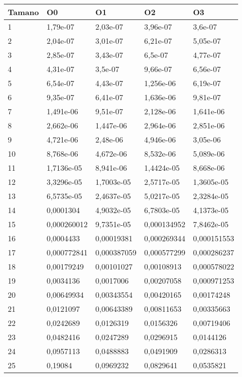 \begin{tabular}{|l|l|l|l|l|}
	\hline
	Tamano & O0 & O1 & O2 & O3 \\
	\hline
	\hline
	1 & 1,79e-07 & 2,03e-07 & 3,96e-07 & 3,6e-07 \\
	\hline
	2 & 2,04e-07 & 3,01e-07 & 6,21e-07 & 5,05e-07 \\
	\hline
	3 & 2,85e-07 & 3,43e-07 & 6,5e-07 & 4,77e-07 \\
	\hline
	4 & 4,31e-07 & 3,5e-07 & 9,66e-07 & 6,56e-07 \\
	\hline
	5 & 6,54e-07 & 4,43e-07 & 1,256e-06 & 6,19e-07 \\
	\hline
	6 & 9,35e-07 & 6,41e-07 & 1,636e-06 & 9,81e-07 \\
	\hline
	7 & 1,491e-06 & 9,51e-07 & 2,128e-06 & 1,641e-06 \\
	\hline
	8 & 2,662e-06 & 1,447e-06 & 2,964e-06 & 2,851e-06 \\
	\hline
	9 & 4,721e-06 & 2,48e-06 & 4,946e-06 & 3,05e-06 \\
	\hline
	10 & 8,768e-06 & 4,672e-06 & 8,532e-06 & 5,089e-06 \\
	\hline
	11 & 1,7136e-05 & 8,941e-06 & 1,4424e-05 & 8,668e-06 \\
	\hline
	12 & 3,3296e-05 & 1,7003e-05 & 2,5717e-05 & 1,3605e-05 \\
	\hline
	13 & 6,5735e-05 & 2,4637e-05 & 5,0217e-05 & 2,3284e-05 \\
	\hline
	14 & 0,0001304 & 4,9032e-05 & 6,7803e-05 & 4,1373e-05 \\
	\hline
	15 & 0,000260012 & 9,7351e-05 & 0,000134952 & 7,8462e-05 \\
	\hline
	16 & 0,0004433 & 0,00019381 & 0,000269344 & 0,000151553 \\
	\hline
	17 & 0,000772841 & 0,000387059 & 0,000577299 & 0,000286237 \\
	\hline
	18 & 0,00179249 & 0,00101027 & 0,00108913 & 0,000578022 \\
	\hline
	19 & 0,0034136 & 0,0017006 & 0,00207058 & 0,000971253 \\
	\hline
	20 & 0,00649934 & 0,00343554 & 0,00420165 & 0,00174248 \\
	\hline
	21 & 0,0121097 & 0,00643389 & 0,00811653 & 0,00335663 \\
	\hline
	22 & 0,0242689 & 0,0126319 & 0,0156326 & 0,00719406 \\
	\hline
	23 & 0,0482416 & 0,0247289 & 0,0296915 & 0,0144126 \\
	\hline
	24 & 0,0957113 & 0,0488883 & 0,0491909 & 0,0286313 \\
	\hline
	25 & 0,19084 & 0,0969232 & 0,0829641 & 0,0535821 \\
	\hline
\end{tabular}
